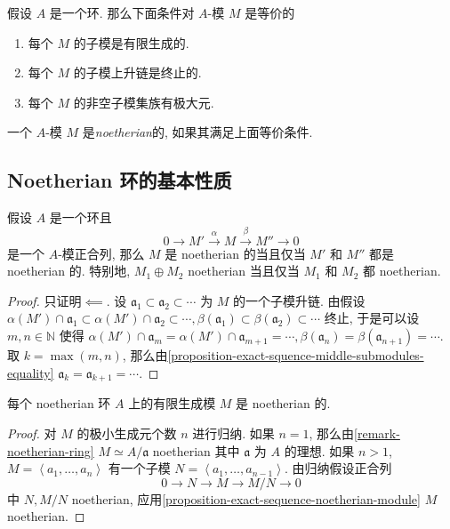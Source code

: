 \begin{proposition}
  \label{proposition-Noetherian-module-iff-condition}
  假设 \( A \) 是一个环. 那么下面条件对 \( A \)-模 \( M \) 是等价的
  \begin{enumerate}
    \item 每个 \( M \) 的子模是有限生成的.
    \item 每个 \( M \) 的子模上升链是终止的.
    \item 每个 \( M \) 的非空子模集族有极大元.
  \end{enumerate}
  一个 \( A \)-模 \( M \) 是\emph{noetherian}的, 如果其满足上面等价条件.
\end{proposition}

\subsection{Noetherian 环的基本性质}

\begin{proposition}
  \label{proposition-exact-sequence-noetherian-module}
  假设 \( A \) 是一个环且
  \[
    0 \to M' \xrightarrow{\alpha} M \xrightarrow{\beta} M'' \to 0
  \]
  是一个 \( A \)-模正合列, 那么 \( M \) 是 noetherian 的当且仅当 \( M' \) 和 \(
  M'' \) 都是 noetherian 的.
  特别地, \( M_1 \oplus M_2 \) noetherian 当且仅当 \( M_1 \) 和 \( M_2 \) 都
  noetherian.
\end{proposition}
\begin{proof}
  只证明\( \impliedby \).
  设 \( \mathfrak{a}_1 \subset \mathfrak{a}_2 \subset \cdots \) 为 \( M \)
  的一个子模升链.
  由假设 \( \alpha(M') \cap \mathfrak{a}_1 \subset \alpha(M') \cap
  \mathfrak{a}_2 \subset \cdots , \beta(\mathfrak{a}_1) \subset
  \beta(\mathfrak{a}_2) \subset \cdots \) 终止, 于是可以设 \( m, n \in
  \mathbb{N} \) 使得 \( \alpha(M') \cap \mathfrak{a}_m = \alpha(M') \cap
  \mathfrak{a}_{m + 1} = \cdots, \beta(\mathfrak{a}_n) = \beta(\mathfrak{a}_{n +
  1}) = \cdots \).
  取 \( k = \max(m, n) \),
  那么由\cref{proposition-exact-squence-middle-submodules-equality} \(
  \mathfrak{a}_{k} = \mathfrak{a}_{k + 1} = \cdots \).
\end{proof}

\begin{proposition}
  \label{proposition-finite-generated-module-over-noetherian-ring}
  每个 noetherian 环 \( A \) 上的有限生成模 \( M \) 是 noetherian 的.
\end{proposition}
\begin{proof}
  对 \( M \) 的极小生成元个数 \( n \) 进行归纳.
  如果 \( n = 1 \), 那么由\cref{remark-noetherian-ring} \( M \simeq
  A/\mathfrak{a} \) noetherian 其中 \( \mathfrak{a} \) 为 \( A \) 的理想.
  如果 \( n > 1 \), \( M = \left\langle a_1,
  \ldots, a_n \right\rangle \) 有一个子模 \( N = \left\langle a_1, \ldots, a_{n
  - 1} \right\rangle \).
  由归纳假设正合列
  \[
    0 \to N \to M \to M / N \to 0
  \]
  中 \( N, M/N \) noetherian,
  应用\cref{proposition-exact-sequence-noetherian-module} \( M \) noetherian.
\end{proof}

